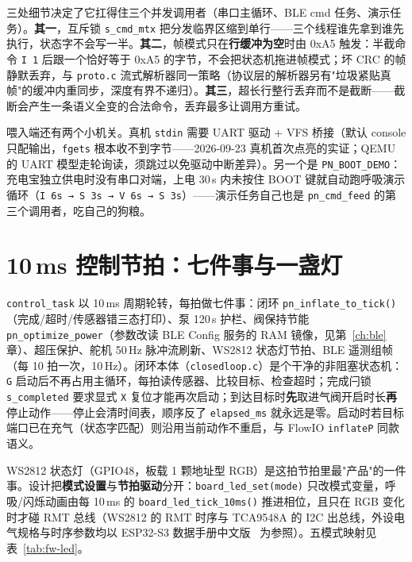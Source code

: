 三处细节决定了它扛得住三个并发调用者（串口主循环、BLE cmd 任务、演示任务）。\textbf{其一}，互斥锁 \texttt{s\_cmd\_mtx} 把分发临界区缩到单行——三个线程谁先拿到谁先执行，状态字不会写一半。\textbf{其二}，帧模式只在\textbf{行缓冲为空}时由 0xA5 触发：半截命令 \texttt{I 1} 后跟一个恰好等于 0xA5 的字节，不会把状态机拖进帧模式；坏 CRC 的帧静默丢弃，与 \texttt{proto.c} 流式解析器同一策略（协议层的解析器另有"垃圾紧贴真帧"的缓冲内重同步，深度有界不递归）。\textbf{其三}，超长行整行丢弃而不是截断——截断会产生一条语义全变的合法命令，丢弃最多让调用方重试。

喂入端还有两个小机关。真机 \texttt{stdin} 需要 UART 驱动 + VFS 桥接（默认 console 只配输出，\texttt{fgets} 根本收不到字节——2026-09-23 真机首次点亮的实证；QEMU 的 UART 模型走轮询读，须跳过以免驱动中断差异）。另一个是 \texttt{PN\_BOOT\_DEMO}：充电宝独立供电时没有串口对端，上电 30\,s 内未按住 BOOT 键就自动跑呼吸演示循环（\texttt{I 6s → S 3s → V 6s → S 3s}）——演示任务自己也是 \texttt{pn\_cmd\_feed} 的第三个调用者，吃自己的狗粮。

\section{10\,ms 控制节拍：七件事与一盏灯}
\label{sec:fw-tick}

\texttt{control\_task} 以 10\,ms 周期轮转，每拍做七件事：闭环 \texttt{pn\_inflate\_to\_tick()}（完成/超时/传感器错三态打印）、泵 120\,s 护栏、阀保持节能 \texttt{pn\_optimize\_power}（参数改读 BLE Config 服务的 RAM 镜像，见第~\ref{ch:ble} 章）、超压保护、舵机 50\,Hz 脉冲流刷新、WS2812 状态灯节拍、BLE 遥测组帧（每 10 拍一次，10\,Hz）。闭环本体（\texttt{closedloop.c}）是个干净的非阻塞状态机：\texttt{G} 启动后不再占用主循环，每拍读传感器、比较目标、检查超时；完成闩锁 \texttt{s\_completed} 要求显式 \texttt{X} 复位才能再次启动；到达目标时\textbf{先}取进气阀开启时长\textbf{再}停止动作——停止会清时间表，顺序反了 \texttt{elapsed\_ms} 就永远是零。启动时若目标端口已在充气（状态字匹配）则沿用当前动作不重启，与 FlowIO \texttt{inflateP} 同款语义。

WS2812 状态灯（GPIO48，板载 1 颗地址型 RGB）是这拍节拍里最"产品"的一件事。设计把\textbf{模式设置}与\textbf{节拍驱动}分开：\texttt{board\_led\_set(mode)} 只改模式变量，呼吸/闪烁动画由每 10\,ms 的 \texttt{board\_led\_tick\_10ms()} 推进相位，且只在 RGB 变化时才碰 RMT 总线（WS2812 的 RMT 时序与 TCA9548A 的 I2C 出总线，外设电气规格与时序参数均以 ESP32-S3 数据手册中文版~\cite{esp32s3-datasheet-cn} 为参照）。五模式映射见表~\ref{tab:fw-led}。

